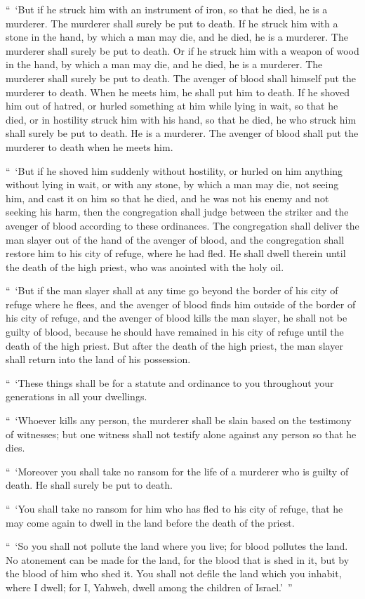 {\par }{\PP {}“ ‘But if he struck him with an instrument of iron, so that he died, he is a murderer. The murderer shall surely be put to death.
If he struck him with a stone in the hand, by which a man may die, and he died, he is a murderer. The murderer shall surely be put to death.
Or if he struck him with a weapon of wood in the hand, by which a man may die, and he died, he is a murderer. The murderer shall surely be put to death.
The avenger of blood shall himself put the murderer to death. When he meets him, he shall put him to death.
If he shoved him out of hatred, or hurled something at him while lying in wait, so that he died,
or in hostility struck him with his hand, so that he died, he who struck him shall surely be put to death. He is a murderer. The avenger of blood shall put the murderer to death when he meets him.
\par }{\PP {}“ ‘But if he shoved him suddenly without hostility, or hurled on him anything without lying in wait,
or with any stone, by which a man may die, not seeing him, and cast it on him so that he died, and he was not his enemy and not seeking his harm,
then the congregation shall judge between the striker and the avenger of blood according to these ordinances.
The congregation shall deliver the man slayer out of the hand of the avenger of blood, and the congregation shall restore him to his city of refuge, where he had fled. He shall dwell therein until the death of the high priest, who was anointed with the holy oil.
\par }{\PP {}“ ‘But if the man slayer shall at any time go beyond the border of his city of refuge where he flees,
and the avenger of blood finds him outside of the border of his city of refuge, and the avenger of blood kills the man slayer, he shall not be guilty of blood,
because he should have remained in his city of refuge until the death of the high priest. But after the death of the high priest, the man slayer shall return into the land of his possession.
\par }{\PP {}“ ‘These things shall be for a statute and ordinance to you throughout your generations in all your dwellings.
\par }{\PP {}“ ‘Whoever kills any person, the murderer shall be slain based on the testimony of witnesses; but one witness shall not testify alone against any person so that he dies.
\par }{\PP {}“ ‘Moreover you shall take no ransom for the life of a murderer who is guilty of death. He shall surely be put to death.
\par }{\PP {}“ ‘You shall take no ransom for him who has fled to his city of refuge, that he may come again to dwell in the land before the death of the priest.
\par }{\PP {}“ ‘So you shall not pollute the land where you live; for blood pollutes the land. No atonement can be made for the land, for the blood that is shed in it, but by the blood of him who shed it.
You shall not defile the land which you inhabit, where I dwell; for I, Yahweh, dwell among the children of Israel.’ ”

}

